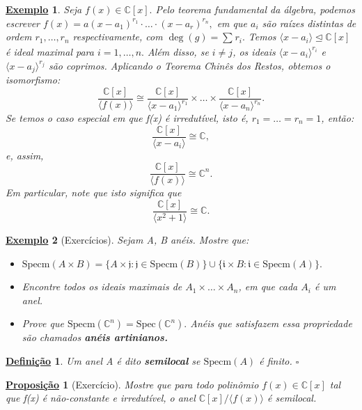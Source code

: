 \documentclass{article}
\newtheorem*{def*}{\underline{Defini\c c\~ao}}
\newtheorem*{prop*}{\underline{Proposi\c c\~ao}}
\newtheorem{example}{\underline{Exemplo}}
\begin{document}
    \begin{example}
      Seja \(f(x)\in \mathbb{C}[x].\) Pelo teorema fundamental da álgebra, podemos escrever \(f(x) = a(x-a_{1})^{r_{1}}\cdot \dotsc \cdot (x-a_{r})^{r_{n}},\)
      em que \(a_{i}\) são raízes distintas de ordem \(r_{1}, \dotsc, r_{n}\) respectivamente, com \(\deg{(g)} = \sum\limits_{}^{}r_{i}.\) Temos
      \(\langle x-a_{i} \rangle \trianglelefteq{\mathbb{C}[x]}\) é ideal maximal para \(i=1, \dotsc, n.\) Além disso, se \(i\neq j\), os ideais
      \(\langle x-a_{i} \rangle^{r_{i}}\) e \(\langle x-a_{j} \rangle^{r_{j}}\) são coprimos. Aplicando o Teorema Chinês dos Restos, obtemos o isomorfismo:
      \[
        \frac{\mathbb{C}[x]}{\langle f(x) \rangle}\cong \frac{\mathbb{C}[x]}{\langle x-a_{1} \rangle^{r_{1}}}\times \dotsc\times \frac{\mathbb{C}[x]}{\langle x-a_{n} \rangle^{r_{n}}}.    
      \]
      Se temos o caso especial em que f(x) é irredutível, isto é, \(r_{1} = \dotsc = r_{n} = 1\), então:
      \[
        \frac{\mathbb{C}[x]}{\langle x-a_{i} \rangle}\cong{\mathbb{C}},
      \]
      e, assim, 
      \[
        \frac{\mathbb{C}[x]}{\langle f(x) \rangle}\cong{\mathbb{C}^{n}}.
      \]
      Em particular, note que isto significa que 
      \[
        \frac{\mathbb{C}[x]}{\langle x^{2}+1 \rangle}\cong \mathbb{C}.
      \]
    \end{example}
    \begin{example}[Exercícios]
      Sejam A, B anéis. Mostre que:
      \begin{itemize}
        \item[1)] \(\mathrm{Specm}(A\times B) = \{A\times \mathfrak{j}:\mathfrak{j}\in \mathrm{Specm}(B)\}\cup\{\mathfrak{i}\times B:\mathfrak{i}\in \mathrm{Specm}(A)\}.\)
        \item[2)] Encontre todos os ideais maximais de \(A_{1}\times \dotsc\times A_{n}\), em que cada
          \(A_{i}\) é um anel.
        \item[3)] Prove que \(\mathrm{Specm}(\mathbb{C}^{n}) = \mathrm{Spec}(\mathbb{C}^{n}).\) Anéis que satisfazem essa propriedade
          são chamados \textbf{anéis artinianos.}
      \end{itemize}
    \end{example}
    \begin{def*}
      Um anel A é dito \textbf{semilocal} se \(\mathrm{Specm}(A)\) é finito. \(\square\)
    \end{def*}
    \begin{prop*}[Exercício]
      Mostre que para todo polinômio \(f(x)\in \mathbb{C}[x]\) tal que f(x) é não-constante e irredutível, o anel
      \(\mathbb{C}[x]/\langle f(x) \rangle\) é semilocal.
    \end{prop*}
    \newpage
\end{document}
